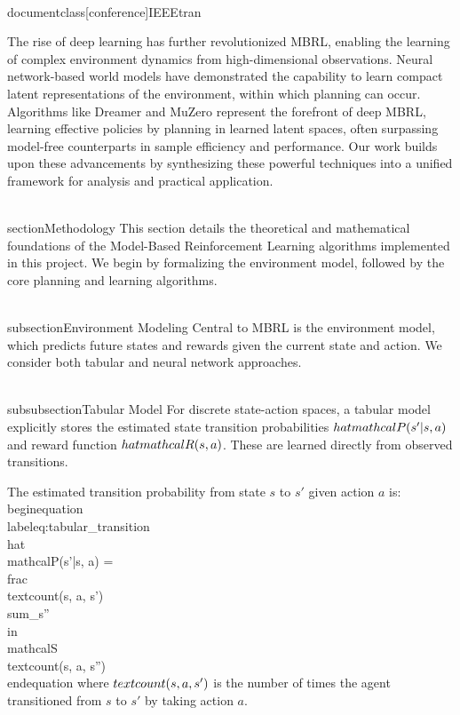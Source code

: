 \\documentclass[conference]{IEEEtran}
\begin{document}
The rise of deep learning has further revolutionized MBRL, enabling the learning of complex environment dynamics from high-dimensional observations. Neural network-based world models \cite{ha2018world} have demonstrated the capability to learn compact latent representations of the environment, within which planning can occur. Algorithms like Dreamer \cite{hafner2019dreamer} and MuZero \cite{schrittwieser2020mastering} represent the forefront of deep MBRL, learning effective policies by planning in learned latent spaces, often surpassing model-free counterparts in sample efficiency and performance. Our work builds upon these advancements by synthesizing these powerful techniques into a unified framework for analysis and practical application.

\\section{Methodology}
This section details the theoretical and mathematical foundations of the Model-Based Reinforcement Learning algorithms implemented in this project. We begin by formalizing the environment model, followed by the core planning and learning algorithms.

\\subsection{Environment Modeling}
Central to MBRL is the environment model, which predicts future states and rewards given the current state and action. We consider both tabular and neural network approaches.

\\subsubsection{Tabular Model}
For discrete state-action spaces, a tabular model explicitly stores the estimated state transition probabilities $\\hat{\\mathcal{P}}(s'|s, a)$ and reward function $\\hat{\\mathcal{R}}(s, a)$. These are learned directly from observed transitions.

The estimated transition probability from state $s$ to $s'$ given action $a$ is:
\\begin{equation}
\\label{eq:tabular_transition}
\\hat{\\mathcal{P}}(s'|s, a) = \\frac{\\text{count}(s, a, s')}{\\sum_{s'' \\in \\mathcal{S}} \\text{count}(s, a, s'')}
\\end{equation}
where $\\text{count}(s, a, s')$ is the number of times the agent transitioned from $s$ to $s'$ by taking action $a$.
\end{document}
